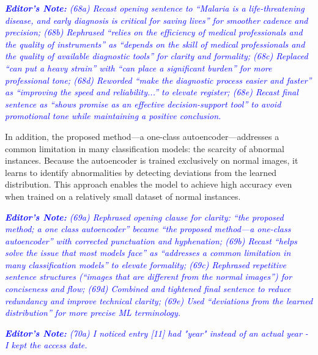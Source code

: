 \documentclass[journal,12pt,onecolumn,draftcls]{IEEEtran}
\newcommand{\editornote}[1]{\par\textit{\textcolor{blue}{\textbf{Editor's Note:} #1}}\par}
\begin{document}
\editornote{
(68a) Recast opening sentence to “Malaria is a life-threatening disease, and early diagnosis is critical for saving lives” for smoother cadence and precision;
(68b) Rephrased “relies on the efficiency of medical professionals and the quality of instruments” as “depends on the skill of medical professionals and the quality of available diagnostic tools” for clarity and formality;
(68c) Replaced “can put a heavy strain” with “can place a significant burden” for more professional tone;
(68d) Reworded “make the diagnostic process easier and faster” as “improving the speed and reliability...” to elevate register;
(68e) Recast final sentence as “shows promise as an effective decision-support tool” to avoid promotional tone while maintaining a positive conclusion.}

In addition, the proposed method—a one-class autoencoder—addresses a common limitation in many classification models: the scarcity of abnormal instances. Because the autoencoder is trained exclusively on normal images, it learns to identify abnormalities by detecting deviations from the learned distribution. This approach enables the model to achieve high accuracy even when trained on a relatively small dataset of normal instances.

\editornote{
(69a) Rephrased opening clause for clarity: “the proposed method; a one class autoencoder” became “the proposed method—a one-class autoencoder” with corrected punctuation and hyphenation;
(69b) Recast “helps solve the issue that most models face” as “addresses a common limitation in many classification models” to elevate formality;
(69c) Rephrased repetitive sentence structures (“images that are different from the normal images”) for conciseness and flow;
(69d) Combined and tightened final sentence to reduce redundancy and improve technical clarity;
(69e) Used “deviations from the learned distribution” for more precise ML terminology.}

\newpage


\editornote{(70a) I noticed entry [11] had "year" instead of an actual year - I kept the access date.}
\end{document}
